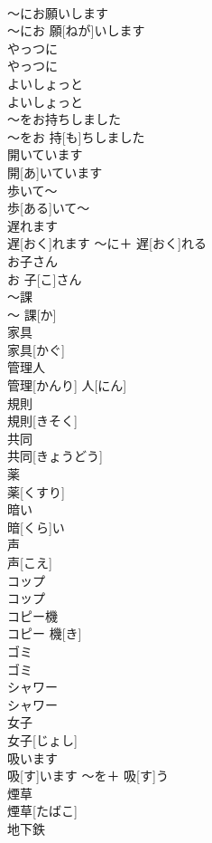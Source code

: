\documentclass[8pt]{extreport}
\begin{document}
\begin{CJK}{UTF8}{min}
\\	〜にお願いします	
\\	〜にお 願[ねが]いします		
\\	やっつに	
\\	やっつに		
\\	よいしょっと	
\\	よいしょっと		
\\	〜をお持ちしました	
\\	〜をお 持[も]ちしました		
\\	開いています	
\\	開[あ]いています		
\\	歩いて〜	
\\	歩[ある]いて〜		
\\	遅れます	
\\	遅[おく]れます	〜に＋ 遅[おく]れる	
\\	お子さん	
\\	お 子[こ]さん		
\\	〜課	
\\	〜 課[か]		
\\	家具	
\\	家具[かぐ]		
\\	管理人	
\\	管理[かんり] 人[にん]		
\\	規則	
\\	規則[きそく]		
\\	共同	
\\	共同[きょうどう]		
\\	薬	
\\	薬[くすり]		
\\	暗い	
\\	暗[くら]い		
\\	声	
\\	声[こえ]		
\\	コップ	
\\	コップ		
\\	コピー機	
\\	コピー 機[き]		
\\	ゴミ	
\\	ゴミ		
\\	シャワー	
\\	シャワー		
\\	女子	
\\	女子[じょし]		
\\	吸います	
\\	吸[す]います	〜を＋ 吸[す]う	
\\	煙草	
\\	煙草[たばこ]		
\\	地下鉄	

\end{CJK}
\end{document}
